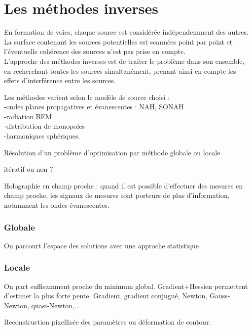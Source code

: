 \section{Les méthodes inverses}
En formation de voies, chaque source est considérée indépendemment des autres. La surface contenant les sources potentielles est scannées point par point et l'éventuelle cohérence des sources n'est pas prise en compte.\\L'approche des méthodes inverses est de traiter le problème dans son ensemble, en recherchant toutes les sources simultanément, prenant ainsi en compte les effets d'interférence entre les sources. 

Les méthodes varient selon le modèle de source choisi : \\
-ondes planes propagatives et évanescentes : NAH, SONAH\\
-radiation BEM\\
-distribution de monopoles\\
-harmoniques sphériques.
 
Résolution d'un problème d'optimisation par méthode globale ou locale

itératif ou non ?

Holographie en champ proche : quand il est possible d'effectuer des mesures en champ proche, les signaux de mesures sont porteurs de plus d'information, notamment les ondes évanescentes.

\subsubsection{Globale}
On parcourt l'espace des solutions avec une approche statistique

\subsubsection{Locale}
On part suffisamment proche du minimum global. Gradient+Hessien permettent d'estimer la plus forte pente. Gradient, gradient conjugué, Newton, Gauss-Newton, quasi-Newton,...

Reconstruction pixellisée des paramètres ou déformation de contour.

